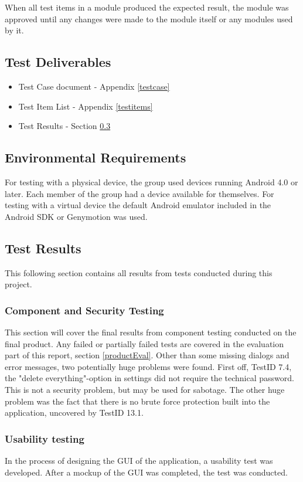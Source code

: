 When all test items in a module produced the expected result, the module was approved until any changes were made to the module itself or any modules used by it.

\subsection{Test Deliverables}

\begin{itemize}
\item Test Case document - Appendix \ref{testcase}
\item Test Item List - Appendix \ref{testitems}
\item Test Results - Section \ref{testresult}

\end{itemize}

\subsection{Environmental Requirements}
For testing with a physical device, the group used devices running Android 4.0 or later. Each member of the group had a device available for themselves.
For testing with a virtual device the default Android emulator included in the Android SDK or Genymotion was used.

\subsection{Test Results}
\label{testresult}
This following section contains all results from tests conducted during this project.

\subsubsection{Component and Security Testing}
This section will cover the final results from component testing conducted on the final product. Any failed or partially failed tests are covered in the evaluation part of this report, section \ref{productEval}. Other than some missing dialogs and error messages, two potentially huge problems were found. First off, TestID 7.4, the "delete everything"-option in settings did not require the technical password. This is not a security problem, but may be used for sabotage. The other huge problem was the fact that there is no brute force protection built into the application, uncovered by TestID 13.1.

\subsubsection{Usability testing}
In the process of designing the GUI of the application, a usability test was developed. After a mockup of the GUI was completed, the test was conducted. 

